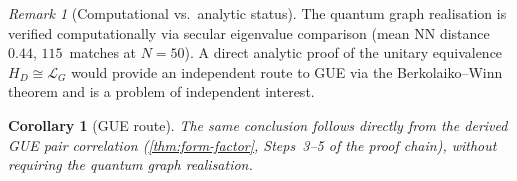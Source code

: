 \documentclass[11pt,a4paper]{article}
\theoremstyle{plain}
\newtheorem{corollary}[theorem]{Corollary}
\theoremstyle{remark}
\newtheorem{remark}[theorem]{Remark}
\begin{document}
\begin{remark}[Computational vs.\ analytic status]
The quantum graph realisation is verified computationally via secular
eigenvalue comparison (mean NN distance~$0.44$, $115$~matches at
$N{=}50$).  A direct analytic proof of the unitary equivalence
$H_D \cong \mathcal{L}_G$ would provide an independent route to GUE
via the Berkolaiko--Winn theorem and is a problem of independent interest.
\end{remark}

\begin{corollary}[GUE route]
\label{cor:gue-conditional}
The same conclusion follows directly from the derived GUE pair
correlation (\cref{thm:form-factor}, Steps~3--5 of the proof chain),
without requiring the quantum graph realisation.
\end{corollary}
\end{document}
